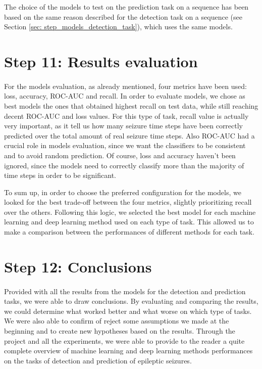 The choice of the models to test on the prediction task on a sequence has been based on the same reason described for the detection task on a sequence (see Section \ref{sec: step_models_detection_task}), which uses the same models.


\section{Step 11: Results evaluation} \label{sec: step_restults_evaluation}
\paragraph{} For the models evaluation, as already mentioned, four metrics have been used: loss, accuracy, ROC-AUC and recall. In order to evaluate models, we chose as best models the ones that obtained highest recall on test data, while still reaching decent ROC-AUC and loss values. For this type of task, recall value is actually very important, as it tell us how many seizure time steps have been correctly predicted over the total amount of real seizure time steps. Also ROC-AUC had a crucial role in models evaluation, since we want the classifiers to be consistent and to avoid random prediction. Of course, loss and accuracy haven't been ignored, since the models need to correctly classify more than the majority of time steps in order to be significant.

To sum up, in order to choose the preferred configuration for the models, we looked for the best trade-off between the four metrics, slightly prioritizing recall over the others. Following this logic, we selected the best model for each machine learning and deep learning method used on each type of task. This allowed us to make a comparison between the performances of different methods for each task.


\section{Step 12: Conclusions} \label{sec: step_conclusions}
\paragraph{} Provided with all the results from the models for the detection and prediction tasks, we were able to draw conclusions. By evaluating and comparing the results, we could determine what worked better and what worse on which type of tasks. We were also able to confirm of reject some assumptions we made at the beginning and to create new hypotheses based on the results. Through the project and all the experiments, we were able to provide to the reader a quite complete overview of machine learning and deep learning methods performances on the tasks of detection and prediction of epileptic seizures.
